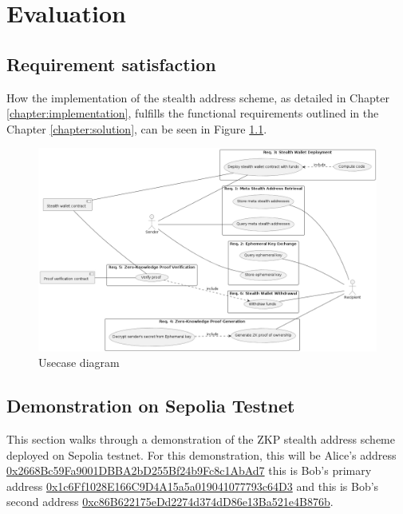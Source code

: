 \chapter{Evaluation}\label{chap:evaluation}

\section{Requirement satisfaction}

How the implementation of the stealth address scheme, as detailed in Chapter
\ref{chapter:implementation}, fulfills the functional requirements outlined in
the Chapter \ref{chapter:solution}, can be seen in Figure \ref{fig:usecase-diagram}.

\begin{figure}[h!]
    \centering
    \includegraphics[width=\textwidth]{assets/images/usecase-diagram.png}
    \caption{Usecase diagram}
    \label{fig:usecase-diagram}
    \vspace{0.5cm}
\end{figure}
\pagebreak

\section{Demonstration on Sepolia Testnet}

This section walks through a demonstration of the ZKP stealth address scheme
deployed on Sepolia testnet. For this demonstration, this will be Alice's
address \href{https://sepolia.etherscan.io/address/0x2668Bc59Fa9001DBBA2bD255Bf24b9Fc8c1AbAd7}{0x2668Bc59Fa9001DBBA2bD255Bf24b9Fc8c1AbAd7}
this is Bob's primary address
\href{https://sepolia.etherscan.io/address/0x1c6Ff1028E166C9D4A15a5a019041077793c64D3}{0x1c6Ff1028E166C9D4A15a5a019041077793c64D3}
and this is Bob's second address
\href{https://sepolia.etherscan.io/address/0xc86B622175eDd2274d374dD86e13Ba521e4B876b}{0xc86B622175eDd2274d374dD86e13Ba521e4B876b}.

